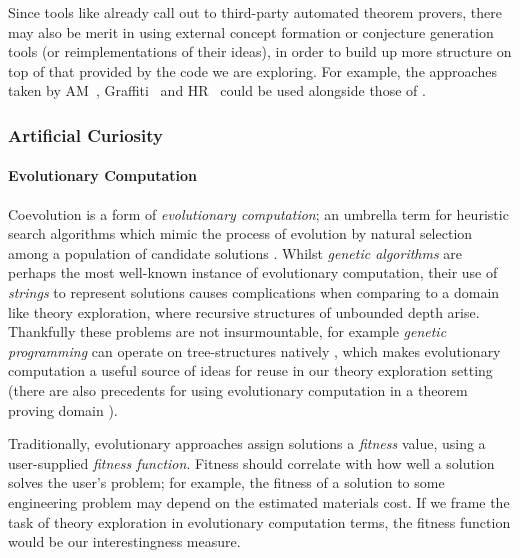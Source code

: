 Since tools like \hipspec{} already call out to third-party automated theorem
provers, there may also be merit in using external concept formation or
conjecture generation tools (or reimplementations of their ideas), in order to
build up more structure on top of that provided by the code we are exploring.
For example, the approaches taken by
AM~\cite{lenat1977automated, lenat1979automated},
Graffiti~\cite{delavina2005some, delavina2005graffiti} and
HR~\cite{colton1999automatic, colton2000agent} could be used alongside those of
\quickspec{}.

\subsubsection{Artificial Curiosity} \label{sec:curiosity} \leavevmode \newline

\paragraph{Evolutionary Computation} \leavevmode \newline

Coevolution is a form of \emph{evolutionary computation}; an umbrella term for
heuristic search algorithms which mimic the process of evolution by natural
selection among a population of candidate solutions
\cite{back1997evolutionary}. Whilst \emph{genetic algorithms} are perhaps the
most well-known instance of evolutionary computation, their use of
\emph{strings} to represent solutions causes complications when comparing to a
domain like theory exploration, where recursive structures of unbounded depth
arise. Thankfully these problems are not insurmountable, for example
\emph{genetic programming} can operate on tree-structures natively
\cite{banzhaf1998genetic}, which makes evolutionary computation a useful source
of ideas for reuse in our theory exploration setting (there are also precedents
for using evolutionary computation in a theorem proving domain
\cite{spector2008genetic}).

Traditionally, evolutionary approaches assign solutions a \emph{fitness} value,
using a user-supplied \emph{fitness function}. Fitness should correlate with how
well a solution solves the user's problem; for example, the fitness of a
solution to some engineering problem may depend on the estimated materials
cost. If we frame the task of theory exploration in evolutionary computation
terms, the fitness function would be our interestingness measure.

